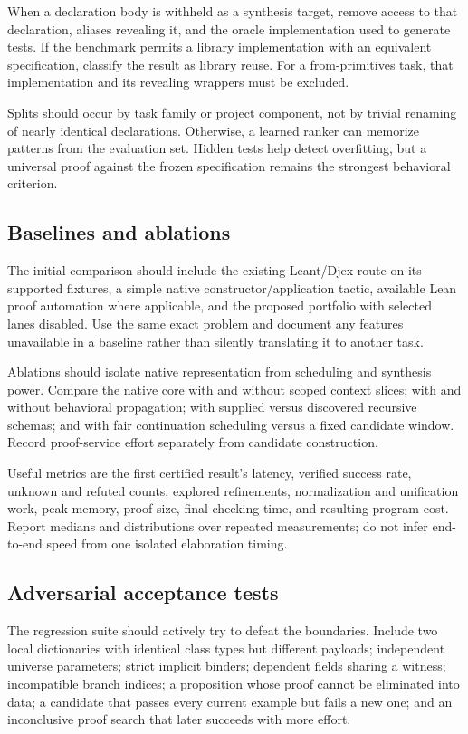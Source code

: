 When a declaration body is withheld as a synthesis target, remove access to that declaration, aliases revealing it, and the oracle implementation used to generate tests. If the benchmark permits a library implementation with an equivalent specification, classify the result as library reuse. For a from-primitives task, that implementation and its revealing wrappers must be excluded.

Splits should occur by task family or project component, not by trivial renaming of nearly identical declarations. Otherwise, a learned ranker can memorize patterns from the evaluation set. Hidden tests help detect overfitting, but a universal proof against the frozen specification remains the strongest behavioral criterion.

\subsection{Baselines and ablations}

The initial comparison should include the existing Leant/Djex route on its supported fixtures, a simple native constructor/application tactic, available Lean proof automation where applicable, and the proposed portfolio with selected lanes disabled. Use the same exact problem and document any features unavailable in a baseline rather than silently translating it to another task.

Ablations should isolate native representation from scheduling and synthesis power. Compare the native core with and without scoped context slices; with and without behavioral propagation; with supplied versus discovered recursive schemas; and with fair continuation scheduling versus a fixed candidate window. Record proof-service effort separately from candidate construction.

Useful metrics are the first certified result's latency, verified success rate, unknown and refuted counts, explored refinements, normalization and unification work, peak memory, proof size, final checking time, and resulting program cost. Report medians and distributions over repeated measurements; do not infer end-to-end speed from one isolated elaboration timing.

\subsection{Adversarial acceptance tests}

The regression suite should actively try to defeat the boundaries. Include two local dictionaries with identical class types but different payloads; independent universe parameters; strict implicit binders; dependent fields sharing a witness; incompatible branch indices; a proposition whose proof cannot be eliminated into data; a candidate that passes every current example but fails a new one; and an inconclusive proof search that later succeeds with more effort.

